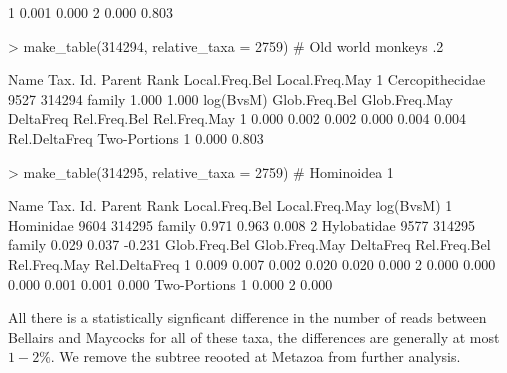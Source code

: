 \documentclass{article}
\begin{document}
\begin{Schunk}
\begin{Soutput}
1         0.001        0.000
2         0.000        0.803
\end{Soutput}
\begin{Sinput}
> make_table(314294, relative_taxa = 2759) # Old world monkeys .2% B and M of all reads
\end{Sinput}
\begin{Soutput}
             Name Tax. Id. Parent   Rank Local.Freq.Bel Local.Freq.May
1 Cercopithecidae     9527 314294 family          1.000          1.000
  log(BvsM) Glob.Freq.Bel Glob.Freq.May DeltaFreq Rel.Freq.Bel Rel.Freq.May
1     0.000         0.002         0.002     0.000        0.004        0.004
  Rel.DeltaFreq Two-Portions
1         0.000        0.803
\end{Soutput}
\begin{Sinput}
> make_table(314295, relative_taxa = 2759) # Hominoidea   1% B 0.7% M of all reads
\end{Sinput}
\begin{Soutput}
         Name Tax. Id. Parent   Rank Local.Freq.Bel Local.Freq.May log(BvsM)
1   Hominidae     9604 314295 family          0.971          0.963     0.008
2 Hylobatidae     9577 314295 family          0.029          0.037    -0.231
  Glob.Freq.Bel Glob.Freq.May DeltaFreq Rel.Freq.Bel Rel.Freq.May Rel.DeltaFreq
1         0.009         0.007     0.002        0.020        0.020         0.000
2         0.000         0.000     0.000        0.001        0.001         0.000
  Two-Portions
1        0.000
2        0.000
\end{Soutput}
\end{Schunk}

All there is a statistically signficant difference in the number of reads between
Bellairs and Maycocks for all of these taxa, the differences are generally at most $1-2\%$. 
We remove the subtree reooted at Metazoa from further analysis.
\end{document}
